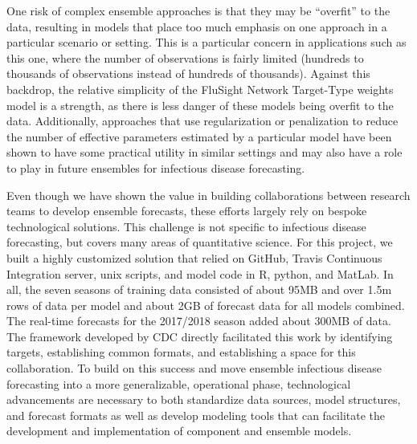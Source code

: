 \documentclass{article}\usepackage[]{graphicx}\usepackage[]{color}
\begin{document}
One risk of complex ensemble approaches is that they may be ``overfit'' to the data, resulting in models that place too much emphasis on one approach in a particular scenario or setting.
This is a particular concern in applications such as this one, where the number of observations is fairly limited (hundreds to thousands of observations instead of hundreds of thousands).
Against this backdrop, the relative simplicity of the FluSight Network Target-Type weights model is a strength, as there is less danger of these models being overfit to the data.
Additionally, approaches that use regularization or penalization to reduce the number of effective parameters estimated by a particular model have been shown to have some practical utility in similar settings and may also have a role to play in future ensembles for infectious disease forecasting.\cite{Ray2018}

Even though we have shown the value in building collaborations between research teams to develop ensemble forecasts, these efforts largely rely on bespoke technological solutions.
This challenge is not specific to infectious disease forecasting, but covers many areas of quantitative science.
For this project, we built a highly customized solution that relied on GitHub, Travis Continuous Integration server, unix scripts, and model code in R, python, and MatLab. 
In all, the seven seasons of training data consisted of about 95MB and over 1.5m rows of data per model and about 2GB of forecast data for all models combined.
The real-time forecasts for the 2017/2018 season added about 300MB of data.
The framework developed by CDC directly facilitated this work by identifying targets, establishing common formats, and establishing a space for this collaboration. To build on this success
and move ensemble infectious disease forecasting into a more generalizable, operational phase, technological advancements are necessary to both standardize data sources, model structures, and forecast formats as well as develop modeling tools that can facilitate the development and implementation of component and ensemble models.
\end{document}
